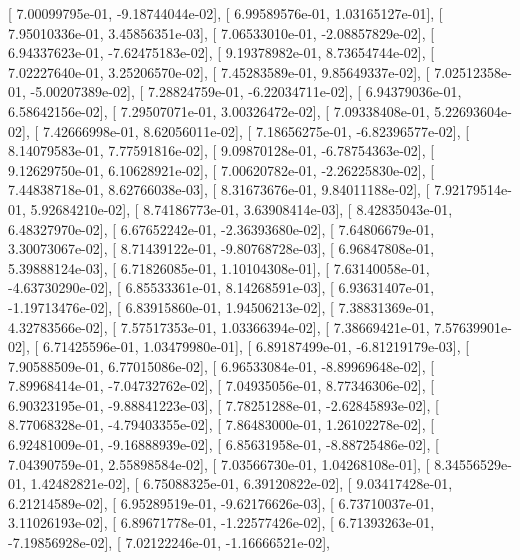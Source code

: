 \documentclass{article}
\begin{document}
       [  7.00099795e-01,  -9.18744044e-02],
       [  6.99589576e-01,   1.03165127e-01],
       [  7.95010336e-01,   3.45856351e-03],
       [  7.06533010e-01,  -2.08857829e-02],
       [  6.94337623e-01,  -7.62475183e-02],
       [  9.19378982e-01,   8.73654744e-02],
       [  7.02227640e-01,   3.25206570e-02],
       [  7.45283589e-01,   9.85649337e-02],
       [  7.02512358e-01,  -5.00207389e-02],
       [  7.28824759e-01,  -6.22034711e-02],
       [  6.94379036e-01,   6.58642156e-02],
       [  7.29507071e-01,   3.00326472e-02],
       [  7.09338408e-01,   5.22693604e-02],
       [  7.42666998e-01,   8.62056011e-02],
       [  7.18656275e-01,  -6.82396577e-02],
       [  8.14079583e-01,   7.77591816e-02],
       [  9.09870128e-01,  -6.78754363e-02],
       [  9.12629750e-01,   6.10628921e-02],
       [  7.00620782e-01,  -2.26225830e-02],
       [  7.44838718e-01,   8.62766038e-03],
       [  8.31673676e-01,   9.84011188e-02],
       [  7.92179514e-01,   5.92684210e-02],
       [  8.74186773e-01,   3.63908414e-03],
       [  8.42835043e-01,   6.48327970e-02],
       [  6.67652242e-01,  -2.36393680e-02],
       [  7.64806679e-01,   3.30073067e-02],
       [  8.71439122e-01,  -9.80768728e-03],
       [  6.96847808e-01,   5.39888124e-03],
       [  6.71826085e-01,   1.10104308e-01],
       [  7.63140058e-01,  -4.63730290e-02],
       [  6.85533361e-01,   8.14268591e-03],
       [  6.93631407e-01,  -1.19713476e-02],
       [  6.83915860e-01,   1.94506213e-02],
       [  7.38831369e-01,   4.32783566e-02],
       [  7.57517353e-01,   1.03366394e-02],
       [  7.38669421e-01,   7.57639901e-02],
       [  6.71425596e-01,   1.03479980e-01],
       [  6.89187499e-01,  -6.81219179e-03],
       [  7.90588509e-01,   6.77015086e-02],
       [  6.96533084e-01,  -8.89969648e-02],
       [  7.89968414e-01,  -7.04732762e-02],
       [  7.04935056e-01,   8.77346306e-02],
       [  6.90323195e-01,  -9.88841223e-03],
       [  7.78251288e-01,  -2.62845893e-02],
       [  8.77068328e-01,  -4.79403355e-02],
       [  7.86483000e-01,   1.26102278e-02],
       [  6.92481009e-01,  -9.16888939e-02],
       [  6.85631958e-01,  -8.88725486e-02],
       [  7.04390759e-01,   2.55898584e-02],
       [  7.03566730e-01,   1.04268108e-01],
       [  8.34556529e-01,   1.42482821e-02],
       [  6.75088325e-01,   6.39120822e-02],
       [  9.03417428e-01,   6.21214589e-02],
       [  6.95289519e-01,  -9.62176626e-03],
       [  6.73710037e-01,   3.11026193e-02],
       [  6.89671778e-01,  -1.22577426e-02],
       [  6.71393263e-01,  -7.19856928e-02],
       [  7.02122246e-01,  -1.16666521e-02],
\end{document}

